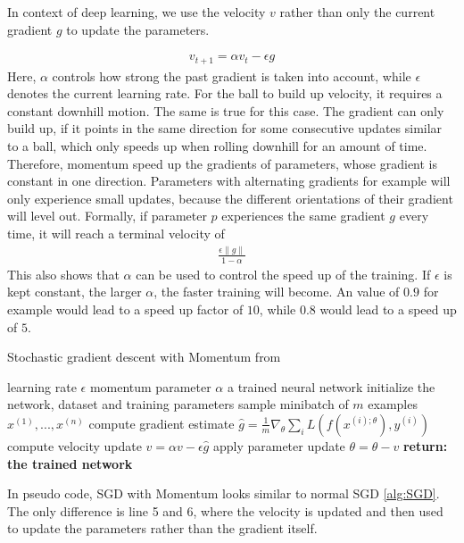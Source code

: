 In context of deep learning, we use the velocity $v$ rather than only the
current gradient $g$ to update the parameters.

\begin{align}
    v_{t+1}=\alpha v_t - \epsilon g
\end{align}
Here, $\alpha$ controls how strong the past gradient is taken into account,
while $\epsilon$ denotes the current learning rate. For the ball to build up
velocity, it requires a constant downhill motion. The same is true for this
case. The gradient can only build up, if it points in the same direction for
some consecutive updates similar to a ball, which only speeds up when rolling
downhill for an amount of time. Therefore, momentum speed up the gradients of
parameters, whose gradient is constant in one direction. Parameters with
alternating gradients for example will only experience small updates, because the
different orientations of their gradient will level out. Formally, if parameter
$p$ experiences the same gradient $g$ every time, it will reach a terminal velocity
of
\begin{align}
    \frac{\epsilon \lVert g \rVert}{1-\alpha}
\end{align}
This also shows that $\alpha$ can be used to control the speed up of the
training. If $\epsilon$ is kept constant, the larger $\alpha$, the faster
training will become. An value of $0.9$ for example would lead to a speed up
factor of $10$, while $0.8$ would lead to a speed up of $5$.

\begin{algorithm}
    \begin{algorithmic}[1]
        \caption{Stochastic gradient descent with Momentum from \cite{Goodfellow-et-al-2016}}
        \REQUIRE learning rate $\epsilon$
        \REQUIRE momentum parameter $\alpha$
        \ENSURE a trained neural network
        \STATE initialize the network, dataset and training parameters
            \STATE sample minibatch of $m$ examples ${x^{(1)}, ... ,x^{(n)}}$
            \STATE compute gradient estimate $\hat{g}=\frac{1}{m} \nabla_\theta \sum_i L(f(x^{(i);\theta}),y^{(i)})$
            \STATE compute velocity update $v=\alpha v - \epsilon \hat{g}$
            \STATE apply parameter update $\theta=\theta-v$
        \ENDWHILE
        \STATE \textbf{return: the trained network}
    \end{algorithmic}
\end{algorithm}

In pseudo code, SGD with Momentum looks similar to normal SGD \ref{alg:SGD}. The
only difference is line 5 and 6, where the velocity is updated and then used to
update the parameters rather than the gradient itself.


